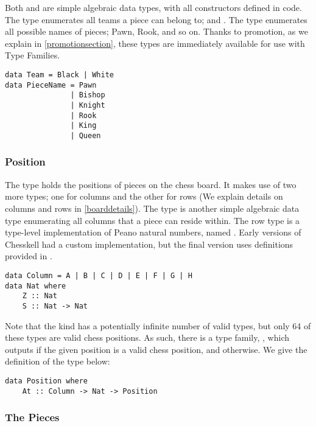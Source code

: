 Both  and  are simple algebraic data types, with all constructors defined in code. The  type enumerates all teams a piece can belong to;  and . The  type enumerates all possible names of pieces; Pawn, Rook, and so on. Thanks to promotion, as we explain in \cref{promotionsection}, these types are immediately available for use with Type Families.

\begin{lstlisting}
data Team = Black | White
data PieceName = Pawn
               | Bishop
               | Knight
               | Rook
               | King
               | Queen
\end{lstlisting}

\subsubsection{Position}

The  type holds the positions of pieces on the chess board. It makes use of two more types; one for columns and the other for rows (We explain details on columns and rows in \cref{boarddetails}). The  type is another simple algebraic data type enumerating all columns that a piece can reside within. The row type is a type-level implementation of Peano natural numbers, named . Early versions of Chesskell had a custom implementation, but the final version uses definitions provided in .

\begin{lstlisting}
data Column = A | B | C | D | E | F | G | H
data Nat where
    Z :: Nat
    S :: Nat -> Nat
\end{lstlisting}

Note that the  kind has a potentially infinite number of valid types, but only 64 of these types are valid chess positions. As such, there is a type family, , which outputs  if the given position is a valid chess position, and  otherwise. We give the definition of the  type below:

\begin{lstlisting}
data Position where
    At :: Column -> Nat -> Position
\end{lstlisting}

\subsubsection{The Pieces}

